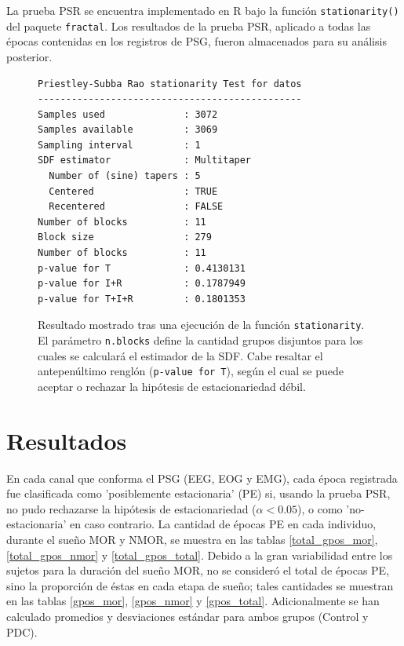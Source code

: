 \documentclass[12pt,a4paper]{mitthesis}
\begin{document}
La prueba PSR se encuentra implementado en R bajo la funci\'on \texttt{stationarity()} del paquete 
\texttt{fractal}.
Los resultados de la prueba PSR, aplicado a todas las \'epocas contenidas en los registros de PSG,
fueron almacenados para su an\'alisis posterior.

\begin{figure}
\centering
\begin{lstlisting}[caption={}]
Priestley-Subba Rao stationarity Test for datos
-----------------------------------------------
Samples used              : 3072 
Samples available         : 3069 
Sampling interval         : 1 
SDF estimator             : Multitaper 
  Number of (sine) tapers : 5 
  Centered                : TRUE 
  Recentered              : FALSE 
Number of blocks          : 11 
Block size                : 279 
Number of blocks          : 11 
p-value for T             : 0.4130131 
p-value for I+R           : 0.1787949 
p-value for T+I+R         : 0.1801353 
\end{lstlisting}
\caption{Resultado mostrado tras una ejecuci\'on de la funci\'on \texttt{stationarity}.
El par\'ametro \texttt{n.blocks} define la cantidad grupos disjuntos para los cuales se 
calcular\'a el estimador de la SDF.
Cabe resaltar el antepen\'ultimo rengl\'on (\texttt{p-value for T}), seg\'un el cual se puede
aceptar o rechazar la hip\'otesis de estacionariedad d\'ebil.}
\label{res_psr}
\end{figure}


\chapter{Resultados}

En cada canal que conforma el PSG (EEG, EOG y EMG), cada \'epoca registrada fue clasificada como 
'posiblemente estacionaria' (PE) si, usando la prueba PSR, no pudo rechazarse la hip\'otesis de 
estacionariedad ($\alpha < 0.05$), o como 'no-estacionaria' en caso contrario.
La cantidad de \'epocas PE en cada individuo, durante el sue\~no MOR y NMOR, se muestra en las 
tablas \ref{total_gpos_mor}, \ref{total_gpos_nmor} y \ref{total_gpos_total}. Debido a la gran 
variabilidad entre los sujetos para la duraci\'on del sue\~no MOR, no se consider\'o el total de 
\'epocas PE, sino la proporci\'on de \'estas en cada etapa de sue\~no; tales cantidades se muestran 
en las tablas \ref{gpos_mor}, \ref{gpos_nmor} y \ref{gpos_total}. 
Adicionalmente se han calculado promedios y desviaciones est\'andar para ambos grupos (Control y 
PDC).
\end{document}
